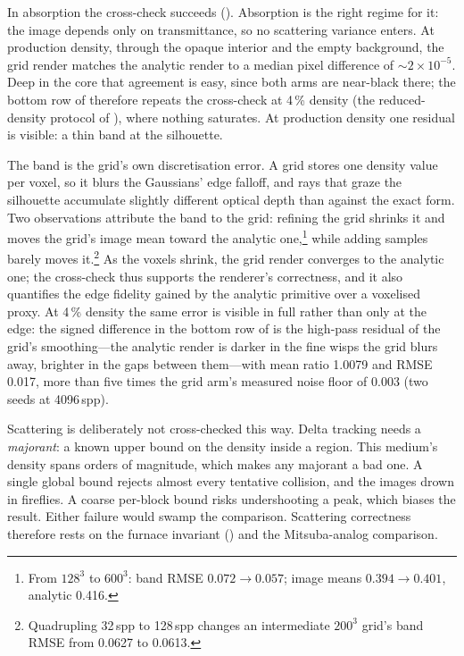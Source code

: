 In absorption the cross-check succeeds (). Absorption is the right regime
for it: the image depends only on transmittance, so no scattering variance enters. At
production density, through the opaque interior and the empty
background, the grid render matches the analytic render to a median pixel difference of
${\sim}2\times10^{-5}$. Deep in the core that agreement is easy, since both arms are
near-black there; the bottom row of  therefore repeats the cross-check at
\num{4}\,\% density (the reduced-density protocol of ), where
nothing saturates. At production density one residual is visible: a thin band at the silhouette.

The band is the grid's own discretisation error. A grid stores one density value per voxel,
so it blurs the Gaussians' edge falloff, and rays that graze the silhouette accumulate
slightly different optical depth than against the exact form. Two observations attribute the
band to the grid: refining the grid shrinks it and moves the grid's image mean toward the
analytic one,\footnote{From $128^3$ to $600^3$:
band RMSE $0.072\!\to\!0.057$; image means $0.394\!\to\!0.401$, analytic \num{0.416}.}
while adding samples barely moves it.\footnote{Quadrupling \num{32}\,spp to \num{128}\,spp
changes an intermediate $200^3$ grid's band RMSE from \num{0.0627} to \num{0.0613}.}
As the voxels shrink, the grid render converges to the analytic one; the cross-check thus
supports the renderer's correctness, and it also quantifies the
edge fidelity gained by the analytic primitive over a voxelised proxy. At \num{4}\,\%
density the same error is visible in full rather than only at the edge: the signed
difference in the bottom row of  is the high-pass residual of the grid's
smoothing---the analytic render is darker in the fine wisps the grid blurs away, brighter in
the gaps between them---with mean ratio \num{1.0079} and RMSE \num{0.017}, more than five
times the grid arm's measured noise floor of \num{0.003} (two seeds at \num{4096}\,spp).

Scattering is deliberately not cross-checked this way. Delta tracking needs a
\emph{majorant}: a known upper bound on the density inside a region. This medium's density
spans orders of magnitude, which makes any majorant a bad one. A single global bound rejects
almost every tentative collision, and the images drown in fireflies. A coarse per-block bound
risks undershooting a peak, which biases the result. Either failure would swamp the
comparison. Scattering correctness therefore rests on the furnace invariant
() and the Mitsuba-analog comparison.

